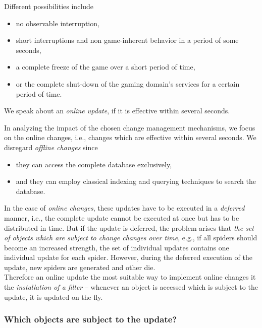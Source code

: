 \documentclass[a4paper, 10pt]{book}
\begin{document}
            Different possibilities include
            \begin{itemize}
                \item no observable interruption, 
                \item short interruptions and non game-inherent behavior in a period
                    of some seconds,
                \item a complete freeze of the game over a short period of time,
                \item or the complete shut-down of the gaming domain's services for
                    a certain period of time.
            \end{itemize}
            We speak about an \emph{online update}, if it is effective within
            several seconds.

            In analyzing the impact of the chosen change management mechanisms,
            we focus on the online changes, i.e., changes which are effective
            within several seconds. We disregard \emph{offline changes} since
            \begin{itemize}
                \item they can access the complete database exclusively,
                \item and they can employ classical indexing and querying techniques to
                    search the database. 
            \end{itemize}

            In the case of \emph{online changes}, these updates have to be
            executed in a \emph{deferred} manner, i.e., the complete update
            cannot be executed at once but has to be distributed in time. But if
            the update is deferred, the problem arises that \emph{the set of
            objects which are subject to change changes over time}, e.g., if
            all spiders should become an increased strength, the set of
            individual updates contains one individual update for each spider.
            However, during the deferred execution of the update, new spiders
            are generated and other
            die.\\
            Therefore an online update the most suitable way to implement online
            changes it the \emph{installation of a filter} -- whenever an object is
            accessed which is subject to the update, it is updated on the fly.

            \subsubsection{Which objects are subject to the update?}
\end{document}
